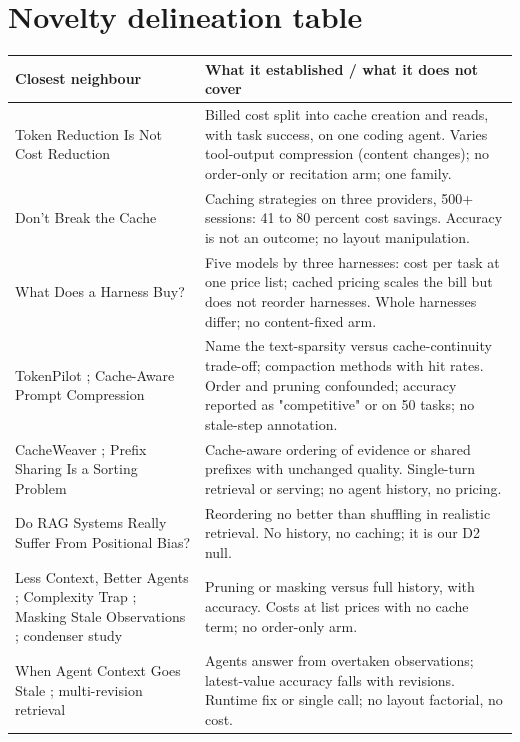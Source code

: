 \section{Novelty delineation table}
\label{app:delineation}
\begin{table}[t]
\small
\centering
\begin{tabular}{p{4.0cm}p{9.2cm}}
\toprule
\textbf{Closest neighbour} & \textbf{What it established / what it does not cover} \\
\midrule
Token Reduction Is Not Cost Reduction \citep{a2607_12161} & Billed cost split into cache creation and reads, with task success, on one coding agent. Varies tool-output compression (content changes); no order-only or recitation arm; one family. \\
Don't Break the Cache \citep{a2601_06007} & Caching strategies on three providers, 500+ sessions: 41 to 80 percent cost savings. Accuracy is not an outcome; no layout manipulation. \\
What Does a Harness Buy? \citep{a2610_04433} & Five models by three harnesses: cost per task at one price list; cached pricing scales the bill but does not reorder harnesses. Whole harnesses differ; no content-fixed arm. \\
TokenPilot \citep{a2606_17016}; Cache-Aware Prompt Compression \citep{a2607_15516} & Name the text-sparsity versus cache-continuity trade-off; compaction methods with hit rates. Order and pruning confounded; accuracy reported as "competitive" or on 50 tasks; no stale-step annotation. \\
CacheWeaver \citep{a2606_19667}; Prefix Sharing Is a Sorting Problem \citep{a2609_13692} & Cache-aware ordering of evidence or shared prefixes with unchanged quality. Single-turn retrieval or serving; no agent history, no pricing. \\
Do RAG Systems Really Suffer From Positional Bias? \citep{a2505_15561} & Reordering no better than shuffling in realistic retrieval. No history, no caching; it is our D2 null. \\
Less Context, Better Agents \citep{a2606_10209}; Complexity Trap \citep{a2508_21433}; Masking Stale Observations \citep{a2606_00408}; condenser study \citep{a2605_18854} & Pruning or masking versus full history, with accuracy. Costs at list prices with no cache term; no order-only arm. \\
When Agent Context Goes Stale \citep{a2610_05281}; multi-revision retrieval \citep{a2603_12271} & Agents answer from overtaken observations; latest-value accuracy falls with revisions. Runtime fix or single call; no layout factorial, no cost. \\

\end{tabular}
\end{table}
